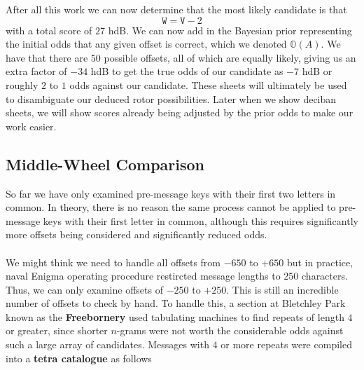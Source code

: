 \noindent After all this work we can now determine that the most
likely candidate is that
\[
	\texttt{W} = \texttt{V} - 2
\]
with a total score of $27$ hdB. We can now add in the Bayesian
prior representing the initial odds that any given offset is
correct, which we denoted $\mathbb{O}(A)$. We have that there are
$50$ possible offsets, all of which are equally likely, giving us
an extra factor of $-34$ hdB to get the true odds of our candidate
as $-7$ hdB or roughly $2$ to $1$ odds against our candidate. These sheets will ultimately be used to disambiguate our deduced rotor possibilities. Later when we show deciban sheets, we will show scores already being adjusted by the prior odds to make our work easier.

\subsection{Middle-Wheel Comparison}
So far we have only examined pre-message keys with their first two
letters in common. In theory, there is no reason the same process
cannot be applied to pre-message keys with their first letter in
common, although this requires significantly more offsets being
considered and significantly reduced odds.
\\\\We might think we need to handle all offsets from $-650$ to $+650$ but in practice, naval Enigma operating procedure restircted message lengths to $250$ characters. Thus, we can only examine offsets of $-250$ to $+250$. This is still an incredible number of offsets to check by hand. To handle this, a section at Bletchley Park known as the {\bf{Freebornery}} used tabulating machines to find repeats of length $4$ or greater, since shorter $n$-grams were not worth the considerable odds against such a large array of candidates. Messages with $4$ or more repeats were compiled into a {\bf{tetra catalogue}} as follows

